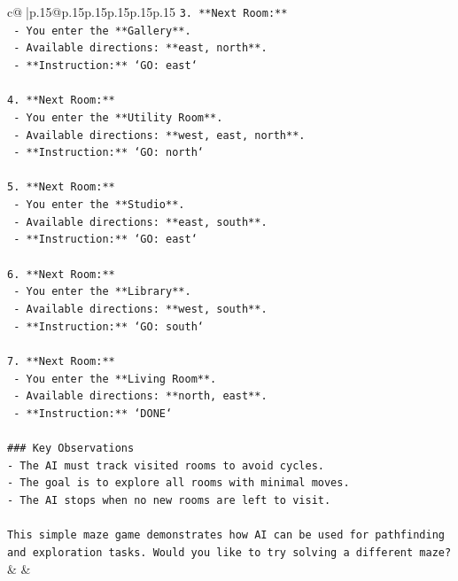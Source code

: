 \documentclass{article}
\begin{document}
{\begin{supertabular}{c@{$\;$}|p{.15\linewidth}@{}p{.15\linewidth}p{.15\linewidth}p{.15\linewidth}p{.15\linewidth}p{.15\linewidth}}
{{{\texttt{3. **Next Room:**} \\
\texttt{   {-} You enter the **Gallery**.} \\
\texttt{   {-} Available directions: **east, north**.} \\
\texttt{   {-} **Instruction:** `GO: east`} \\
\\ 
\texttt{4. **Next Room:**} \\
\texttt{   {-} You enter the **Utility Room**.} \\
\texttt{   {-} Available directions: **west, east, north**.} \\
\texttt{   {-} **Instruction:** `GO: north`} \\
\\ 
\texttt{5. **Next Room:**} \\
\texttt{   {-} You enter the **Studio**.} \\
\texttt{   {-} Available directions: **east, south**.} \\
\texttt{   {-} **Instruction:** `GO: east`} \\
\\ 
\texttt{6. **Next Room:**} \\
\texttt{   {-} You enter the **Library**.} \\
\texttt{   {-} Available directions: **west, south**.} \\
\texttt{   {-} **Instruction:** `GO: south`} \\
\\ 
\texttt{7. **Next Room:**} \\
\texttt{   {-} You enter the **Living Room**.} \\
\texttt{   {-} Available directions: **north, east**.} \\
\texttt{   {-} **Instruction:** `DONE`} \\
\\ 
\texttt{\#\#\# Key Observations} \\
\texttt{{-} The AI must track visited rooms to avoid cycles.} \\
\texttt{{-} The goal is to explore all rooms with minimal moves.} \\
\texttt{{-} The AI stops when no new rooms are left to visit.} \\
\\ 
\texttt{This simple maze game demonstrates how AI can be used for pathfinding and exploration tasks. Would you like to try solving a different maze?} \\
            }
        }
    }
    & & \\ \\


\end{supertabular}}
\end{document}
